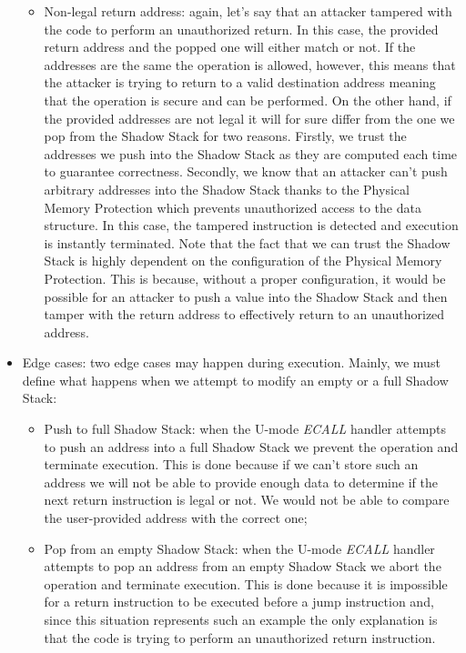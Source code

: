 \begin{itemize}
\begin{itemize}
      \item Non-legal return address: again, let's say that an attacker tampered
        with the code to perform an unauthorized return. In this case, the provided
        return address and the popped one will either match or not. If the
        addresses are the same the operation is allowed, however, this means
        that the attacker is trying to return to a valid destination address
        meaning that the operation is secure and can be performed. On the other hand,
        if the provided addresses are not legal it will for sure differ from the
        one we pop from the Shadow Stack for two reasons. Firstly, we trust the
        addresses we push into the Shadow Stack as they are computed each time
        to guarantee correctness. Secondly, we know that an attacker can't push
        arbitrary addresses into the Shadow Stack thanks to the Physical Memory
        Protection which prevents unauthorized access to the data structure. In this
        case, the tampered instruction is detected and execution is instantly
        terminated. Note that the fact that we can trust the Shadow Stack is highly
        dependent on the configuration of the Physical Memory Protection. This
        is because, without a proper configuration, it would be possible for an
        attacker to push a value into the Shadow Stack and then tamper with the
        return address to effectively return to an unauthorized address.
    \end{itemize}

  \item Edge cases: two edge cases may happen during execution. Mainly, we must
    define what happens when we attempt to modify an empty or a full Shadow
    Stack:
    \begin{itemize}
      \item Push to full Shadow Stack: when the U-mode \textit{ECALL} handler attempts
        to push an address into a full Shadow Stack we prevent the operation and
        terminate execution. This is done because if we can't store such an
        address we will not be able to provide enough data to determine if the
        next return instruction is legal or not. We would not be able to compare
        the user-provided address with the correct one;

      \item Pop from an empty Shadow Stack: when the U-mode \textit{ECALL} handler
        attempts to pop an address from an empty Shadow Stack we abort the operation
        and terminate execution. This is done because it is impossible for a
        return instruction to be executed before a jump instruction and, since this
        situation represents such an example the only explanation is that the code
        is trying to perform an unauthorized return instruction.
    \end{itemize}
\end{itemize}

